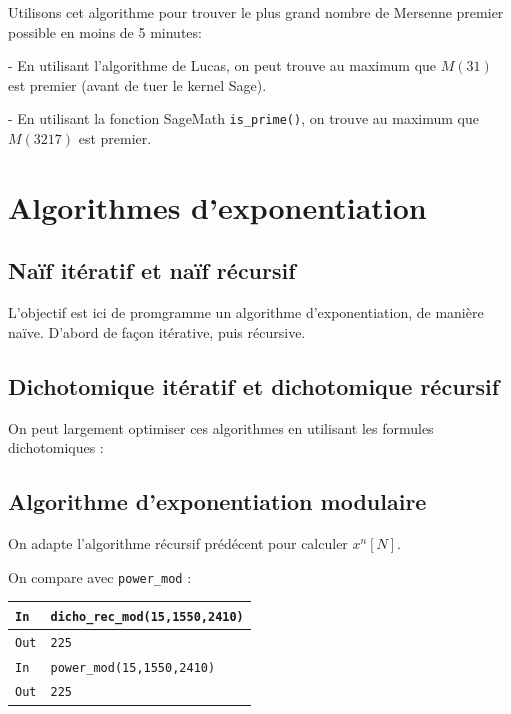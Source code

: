 \documentclass[titlepage]{article}
\begin{document}
    Utilisons cet algorithme pour trouver le plus grand nombre de Mersenne premier possible en moins de 5 minutes:

    - En utilisant l'algorithme de Lucas, on peut trouve au maximum que $M(31)$ est premier (avant de tuer le kernel Sage).

    - En utilisant la fonction SageMath \texttt{is\_prime()}, on trouve au maximum que $M(3217)$ est premier.

    \section{Algorithmes d'exponentiation}
    \subsection{Naïf itératif et naïf récursif}
    L'objectif est ici de promgramme un algorithme d'exponentiation, de manière naïve. D'abord de façon itérative, puis récursive.

    

    

    \subsection{Dichotomique itératif et dichotomique récursif}

    On peut largement optimiser ces algorithmes en utilisant \- les formules dichotomiques : 

    

    

    \subsection{Algorithme d'exponentiation modulaire}
    On adapte l'algorithme récursif prédécent pour calculer $x^n [N]$.

    

    On compare avec \texttt{power\_mod} :\bigbreak

    \begin{tabularx}{12cm}{|p{0.60cm}|X|}
        \hline
        \rowcolor{gray}
        \texttt{In}
        & 
        \texttt{dicho\_rec\_mod(15,1550,2410)}
        \\
        \hline
        \texttt{Out}
        &
        \texttt{225}
        \\
        \hline
        \rowcolor{gray}
        \texttt{In}
        & 
        \texttt{power\_mod(15,1550,2410)}
        \\
        \hline
        \texttt{Out}
        &
        \texttt{225}
        \\
        \hline
    \end{tabularx}
    \bigbreak
\end{document}

